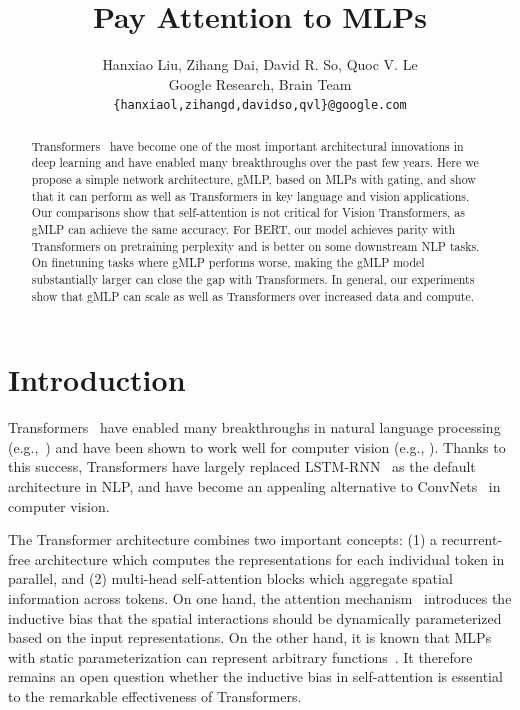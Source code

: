 \documentclass{article}
\title{Pay Attention to MLPs}
\author{
Hanxiao Liu, Zihang Dai, David R. So, Quoc V. Le \\
Google Research, Brain Team \\
\texttt{\{hanxiaol,zihangd,davidso,qvl\}@google.com}
}
\newcommand{\gffn}{gMLP\xspace}
\begin{document}
\maketitle

\begin{abstract}
Transformers~\cite{vaswani2017attention} have become one of the most important architectural innovations in deep learning and have enabled many breakthroughs over the past few years.  
Here we propose a simple network architecture, \gffn, based on MLPs with gating, and show that it can perform as well as Transformers in key language and vision applications. 
Our comparisons show that self-attention is not critical for Vision Transformers, as \gffn can achieve the same accuracy. For BERT, our model achieves parity with Transformers on pretraining perplexity
and is better on some downstream NLP tasks.
On finetuning tasks where \gffn performs worse, making the \gffn model substantially larger can close the gap with Transformers.
In general, our experiments show that \gffn can scale as well as Transformers over increased data and compute.

\end{abstract}

\section{Introduction}
\label{sec:intro}

Transformers~\cite{vaswani2017attention} have enabled many  breakthroughs in natural language processing (e.g.,~\cite{devlin2018bert, yang2019xlnet,liu2019roberta,raffel2019exploring,brown2020language}) and have been shown to work well for computer vision (e.g., \cite{dosovitskiy2020image, touvron2020training,carion2020end, liu2021swin}). Thanks to this success, Transformers have largely replaced LSTM-RNN~\cite{lstm} as the default architecture in NLP, and have become an appealing alternative to ConvNets~\cite{lecun,krizhevsky2012imagenet,simonyan2014very,szegedy2015going,he2016deep,tan2019efficientnet} in computer vision.

The Transformer architecture combines two important concepts: (1) a recurrent-free architecture which computes the representations for each individual token in parallel, and (2) multi-head self-attention blocks which aggregate spatial information across tokens.
On one hand,
the attention mechanism~\cite{bahdanau2014neural} introduces the inductive bias that the spatial interactions should be 
dynamically parameterized based on the input representations.
On the other hand, it is known that MLPs with static parameterization can represent arbitrary functions~\cite{hornik1989multilayer}.
It therefore remains an open question whether the inductive bias in self-attention is essential to the remarkable effectiveness of Transformers.
\end{document}
